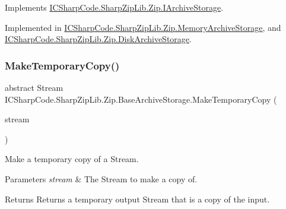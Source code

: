 Implements \hyperlink{interface_i_c_sharp_code_1_1_sharp_zip_lib_1_1_zip_1_1_i_archive_storage_aa8c04ba6ece88eb03473135299de0a43}{I\+C\+Sharp\+Code.\+Sharp\+Zip\+Lib.\+Zip.\+I\+Archive\+Storage}.



Implemented in \hyperlink{class_i_c_sharp_code_1_1_sharp_zip_lib_1_1_zip_1_1_memory_archive_storage_a0cdd04c578ddab179ae057c4190cffd8}{I\+C\+Sharp\+Code.\+Sharp\+Zip\+Lib.\+Zip.\+Memory\+Archive\+Storage}, and \hyperlink{class_i_c_sharp_code_1_1_sharp_zip_lib_1_1_zip_1_1_disk_archive_storage_a5f99f82e221c964f9177c16c7c775e3f}{I\+C\+Sharp\+Code.\+Sharp\+Zip\+Lib.\+Zip.\+Disk\+Archive\+Storage}.

\mbox{\label{class_i_c_sharp_code_1_1_sharp_zip_lib_1_1_zip_1_1_base_archive_storage_a3580cacd0a0e6b3045bdeeaed72cb492}} 
\subsubsection{\texorpdfstring{Make\+Temporary\+Copy()}{MakeTemporaryCopy()}}
{\footnotesize\ttfamily abstract Stream I\+C\+Sharp\+Code.\+Sharp\+Zip\+Lib.\+Zip.\+Base\+Archive\+Storage.\+Make\+Temporary\+Copy (\begin{DoxyParamCaption}\item[{Stream}]{stream }\end{DoxyParamCaption})\hspace{0.3cm}{\ttfamily [pure virtual]}}



Make a temporary copy of a Stream. 


\begin{DoxyParams}{Parameters}
{\em stream} & The Stream to make a copy of.\\
\hline
\end{DoxyParams}
\begin{DoxyReturn}{Returns}
Returns a temporary output Stream that is a copy of the input.
\end{DoxyReturn}


